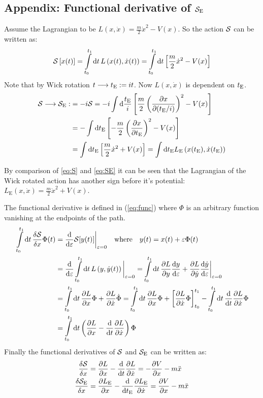 \newpage
\subsection{Appendix: Functional derivative of $\mathcal{S}_{\mathrm{E}}$\label{app:derivSE}}

Assume the Lagrangian to be $L(x,\dot{x})=\frac{m}{2} \dot{x}^2-V(x)$. So the action $\mathcal{S}$ can be written as:
\begin{align}
    \mathcal{S}\left[x(t)\right] = \int\limits_{t_0}^{t_1}\dd{t}L\left(x(t), \dot{x}(t)\right) = \int\limits_{t_0}^{t_1}\dd{t}\left[\frac{m}{2}\dot{x}^2-V(x)\right]\label{eq:S}
\end{align}
\noindent Note that by Wick rotation $t\longrightarrow t_{\mathrm{E}}:=it$. Now $L(x,\dot{x})$ is dependent on $t_{\mathrm{E}}$.
\begin{align}
    \mathcal{S}\longrightarrow\mathcal{S}_{\mathrm{E}}:&=-i\mathcal{S}
    =-i\int\dd\frac{t_{\mathrm{E}}}{i}\left[\frac{m}{2}\left(\pdv{x}{(\ensuremath{t_{\mathrm{E}}}/i)}\right)^2-V(x)\right] \\
    &=-\int\dd t_{\mathrm{E}}\left[-\frac{m}{2}\left(\pdv{x}{\ensuremath{t_{\mathrm{E}}}}\right)^2-V(x)\right] \\
    &=\int\dd t_{\mathrm{E}}\left[\frac{m}{2}\dot{x}^2+V(x)\right] =  \int\dd t_{\mathrm{E}} L_\mathrm{E}\left(x(t_\mathrm{E}), \dot{x}(t_\mathrm{E})\right)\label{eq:SE}
\end{align}

\noindent By comparison of \cref{eq:S} and \cref{eq:SE} it can be seen that the Lagrangian of the Wick rotated action has another sign before it's potential: $L_\mathrm{E}(x,\dot{x})=\frac{m}{2} \dot{x}^2+V(x)$.

\noindent The functional derivative is defined in (\ref{eq:func}) where $\Phi$ is an arbitrary function vanishing at the endpoints of the path.
\begin{align}{}
    \int\limits_{t_0}^{t_1} \dd{t} \fdv{\action}{x} \Phi (t) &= \dv{\varepsilon} \action [y(t)]\bigg|_{\varepsilon = 0}\quad \text{where} \quad y(t) = x(t) + \varepsilon \Phi(t) \label{eq:func}\\
    &= \dv{\varepsilon} \int\limits_{t_0}^{t_1}\dd{t}L\left(y, \dot{y}(t)\right)\bigg|_{\varepsilon = 0} = \int\limits_{t_0}^{t_1}\dd{t}\pdv{L}{y}\dv{y}{\varepsilon} + \pdv{L}{\dot{y}}\dv{\dot{y}}{\varepsilon}\bigg|_{\varepsilon = 0}\\
    &= \int\limits_{t_0}^{t_1}\dd{t}\pdv{L}{x}\Phi + \pdv{L}{\dot{x}}\dot{\Phi} = \int\limits_{t_0}^{t_1}\dd{t}\pdv{L}{x}\Phi + \left[ \pdv{L}{\dot{x}} \Phi\right]_{t_0}^{t_1}- \int \limits_{t_0}^{t_1} \dd{t} \dv{t}\pdv{L}{\dot{x}}\Phi\\
    &= \int\limits_{t_0}^{t_1}\dd{t}\left( \pdv{L}{x} - \dv{t}\pdv{L}{\dot{x}} \right)\Phi
\end{align}
Finally the functional derivatives of $\mathcal{S}$ and $\mathcal{S}_\mathrm{E}$ can be written as:
\begin{align}{}
    \fdv{\action}{x}&= \pdv{L}{x} - \dv{t} \pdv{L}{\dot{x}} = - \pdv{V}{x} - m \ddot{x}\\
    \fdv{\action_\mathrm{E}}{x}&= \pdv{L_\mathrm{E}}{x} - \dv{t_\mathrm{E}} \pdv{L_\mathrm{E}}{\dot{x}} = \pdv{V}{x} - m \ddot{x}
\end{align}{}
\\

